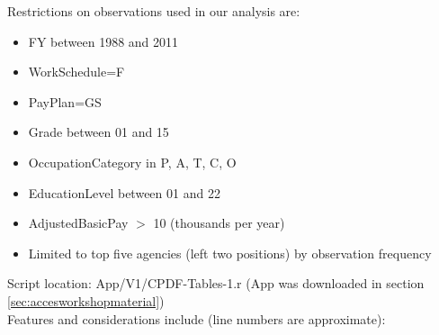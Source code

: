 \documentclass[10pt, letterpaper]{article}
\begin{document}
\begin{spacing}{1.0}
\vspace{4pt}

Restrictions on observations used in our analysis are:

\begin{itemize}[noitemsep]
    \item FY between 1988 and 2011
    \item WorkSchedule=F
    \item PayPlan=GS
    \item Grade between 01 and 15
    \item OccupationCategory in {P, A, T, C, O}
    \item EducationLevel between 01 and 22
    \item AdjustedBasicPay $>$ 10 (thousands per year)
    \item Limited to top five agencies (left two positions) by observation frequency
\end{itemize}

Script location:  App/V1/CPDF-Tables-1.r (App was downloaded in section \ref{sec:accesworkshopmaterial})\\

Features and considerations include (line numbers are approximate):


\end{spacing}
\end{document}
